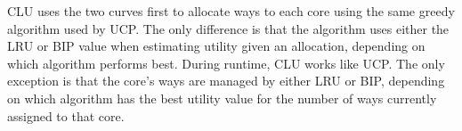 CLU uses the two curves first to allocate ways to each core using the same greedy algorithm used by UCP.
The only difference is that the algorithm uses either the LRU or BIP value when estimating utility given an allocation, depending on which algorithm performs best.
During runtime, CLU works like UCP.
The only exception is that the core's ways are managed by either LRU or BIP, depending on which algorithm has the best utility value for the number of ways currently assigned to that core.